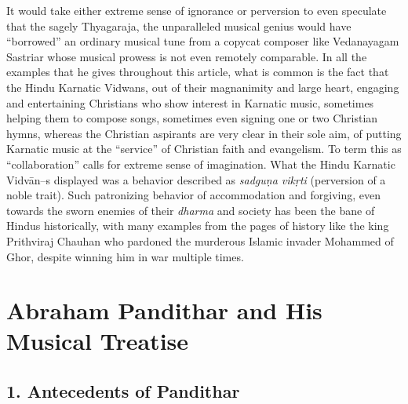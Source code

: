 It would take either extreme sense of ignorance or perversion to even speculate that the sagely Thyagaraja, the unparalleled musical genius would have “borrowed” an ordinary musical tune from a copycat composer like Vedanayagam Sastriar whose musical prowess is not even remotely comparable. In all the examples that he gives throughout this article, what is common is the fact that the Hindu Karnatic Vidwans, out of their magnanimity and large heart, engaging and entertaining Christians who show interest in Karnatic music, sometimes helping them to compose songs, sometimes even signing one or two Christian hymns, whereas the Christian aspirants are very clear in their sole aim, of putting Karnatic music at the “service” of Christian faith and evangelism. To term this as “collaboration” calls for extreme sense of imagination. What the Hindu Karnatic Vidvān–s displayed was a behavior described as \textit{sadguṇa vikṛti} (perversion of a noble trait). Such patronizing behavior of accommodation and forgiving, even towards the sworn enemies of their \textit{dharma} and society has been the bane of Hindus historically, with many examples from the pages of history like the king Prithviraj Chauhan who pardoned the murderous Islamic invader Mohammed of Ghor, despite winning him in war multiple times.


\section*{Abraham Pandithar and His Musical Treatise}

\subsection*{1. Antecedents of Pandithar}

